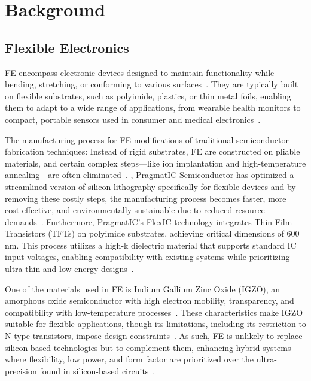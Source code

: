 \section{Background}\label{sec:background}

\subsection{Flexible Electronics}

FE encompass electronic devices designed to maintain functionality while bending, stretching, or conforming to various surfaces~\cite{FlexibleElectronics}. 
They are typically built on flexible substrates, such as polyimide, plastics, or thin metal foils, enabling them to adapt to a wide range of applications, from wearable health monitors to compact, portable sensors used in consumer and medical electronics~\cite{Heng:AM2022:FlexHumanMachInterfaces,Gao:FlexibleWearableSensing,gao:2016:flexsensor}. 

The manufacturing process for FE  modifications of traditional semiconductor fabrication techniques: 
Instead of rigid substrates, FE are constructed on pliable materials, and certain complex steps—like ion implantation and high-temperature annealing—are often eliminated~\cite{Baruah:FabricationFE2023}.
, PragmatIC Semiconductor has optimized a streamlined version of silicon lithography specifically for flexible devices and by removing these costly steps, the manufacturing process becomes faster, more cost-effective, and environmentally sustainable due to reduced resource demands~\cite{FlexICs}. 
Furthermore, PragmatIC’s FlexIC technology integrates Thin-Film Transistors (TFTs) on polyimide substrates, achieving critical dimensions of 600 nm. 
This process utilizes a high-k dielectric material that supports standard IC input voltages, enabling compatibility with existing systems while prioritizing ultra-thin and low-energy designs~\cite{FlexICs}.

One of the materials used in FE is Indium Gallium Zinc Oxide (IGZO), an amorphous oxide semiconductor with high electron mobility, transparency, and compatibility with low-temperature processes~\cite{Zhu:IGZO2021,Pan:IGZOTFT2024}. 
These characteristics make IGZO suitable for flexible applications, though its limitations, including its restriction to N-type transistors, impose design constraints~\cite{Jeong:igzoperformance}. 
As such, FE is unlikely to replace silicon-based technologies but to complement them, enhancing hybrid systems where flexibility, low power, and form factor are prioritized over the ultra-precision found in silicon-based circuits~\cite{Lozano:aspdac25:BinCoDesign}.

